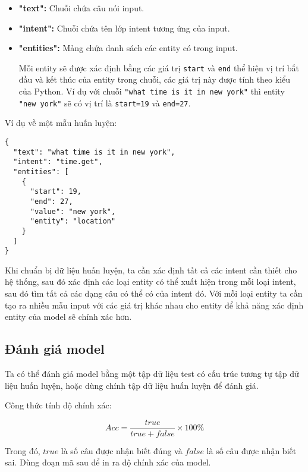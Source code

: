 \begin{itemize}
    \item \textbf{"text":} Chuỗi chứa câu nói input.
    
    \item \textbf{"intent":} Chuỗi chứa tên lớp intent tương ứng của input.
    
    \item \textbf{"entities":} Mảng chứa danh sách các entity có trong input.
    
    Mỗi entity sẽ được xác định bằng các giá trị \lstinline{start} và \lstinline{end} thể hiện vị trí bắt đầu và kết thúc của entity trong chuỗi, các giá trị này được tính theo kiểu của Python. Ví dụ với chuỗi \lstinline{"what time is it in new york"} thì entity \lstinline{"new york"} sẽ có vị trí là \lstinline{start=19} và \lstinline{end=27}.
\end{itemize}

Ví dụ về một mẫu huấn luyện:

\begin{lstlisting}
{
  "text": "what time is it in new york",
  "intent": "time.get",
  "entities": [
    {
      "start": 19,
      "end": 27,
      "value": "new york",
      "entity": "location"
    }
  ]
}
\end{lstlisting}

Khi chuẩn bị dữ liệu huấn luyện, ta cần xác định tất cả các intent cần thiết cho hệ thống, sau đó xác định các loại entity có thể xuất hiện trong mỗi loại intent, sau đó tìm tất cả các dạng câu có thể có của intent đó. Với mỗi loại entity ta cần tạo ra nhiều mẫu input với các giá trị khác nhau cho entity để khả năng xác định entity của model sẽ chính xác hơn.

\subsection{Đánh giá model}

Ta có thể đánh giá model bằng một tập dữ liệu test có cấu trúc tương tự tập dữ liệu huấn luyện, hoặc dùng chính tập dữ liệu huấn luyện để đánh giá.

Công thức tính độ chính xác:

\begin{equation}
Acc = \frac{true}{true + false} \times 100\%
\end{equation}

Trong đó, $true$ là số câu được nhận biết đúng và $false$ là số câu được nhận biết sai. Dùng đoạn mã sau để in ra độ chính xác của model.

